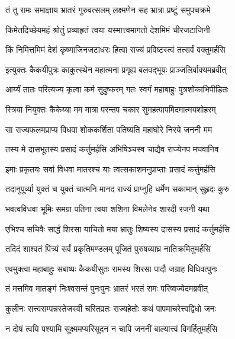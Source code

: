 
\twolineshloka
{तं तु रामः समाज्ञाय भ्रातरं गुरुवत्सलम्}
{लक्ष्मणेन सह भ्रात्रा प्रष्टुं समुपचक्रमे} %

\twolineshloka
{किमेतदिच्छेयमहं श्रोतुं प्रव्याहृतं त्वया}
{यस्मात्त्वमागतो देशमिमं चीरजटाजिनी} %

\twolineshloka
{किं निमित्तमिमं देशं कृष्णाजिनजटाधरः}
{हित्वा राज्यं प्रविष्टस्त्वं तत्सर्वं वक्तुमर्हसि} %

\twolineshloka
{इत्युक्तः कैकयीपुत्रः काकुत्स्थेन महात्मना}
{प्रगृह्य बलवद्भूयः प्राञ्जलिर्वाक्यमब्रवीत्} %

\twolineshloka
{आर्य्यं तातः परित्यज्य कृत्वा कर्म सुदुष्करम्}
{गतः स्वर्गं महाबाहुः पुत्रशोकाभिपीडितः} %

\twolineshloka
{स्त्रिया नियुक्तः कैकेय्या मम मात्रा परन्तप}
{चकार सुमहत्पापमिदमात्मयशोहरम्} %

\twolineshloka
{सा राज्यफलमप्राप्य विधवा शोककर्शिता}
{पतिष्यति महाघोरे निरये जननी मम} %

\twolineshloka
{तस्य मे दासभूतस्य प्रसादं कर्त्तुमर्हसि}
{अभिषिञ्चस्व चाद्यैव राज्येनप मघवानिव} %

\twolineshloka
{इमाः प्रकृतयः सर्वा विधवा मातरश्च याः}
{त्वत्सकाशमनुप्राप्ताः प्रसादं कर्त्तुमर्हसि} %

\twolineshloka
{तदानुपूर्व्या युक्तं च युक्तं चात्मनि मानद}
{राज्यं प्राप्नुहि धर्मेण सकामान् सुहृदः कुरु} %

\twolineshloka
{भवत्वविधवा भूमिः समग्रा पतिना त्वया}
{शशिना विमलेनेव शारदी रजनी यथा} %

\twolineshloka
{एभिश्च सचिवैः सार्द्धं शिरसा याचितो मया}
{भ्रातुः शिष्यस्य दासस्य प्रसादं कर्त्तुमर्हसि} %

\twolineshloka
{तदिदं शाश्वतं पित्र्यं सर्वं प्रकृतिमण्डलम्}
{पूजितं पुरुषव्याघ्र नातिक्रमितुमर्हसि} %

\twolineshloka
{एवमुक्त्वा महाबाहुः सबाष्पः कैकयीसुतः}
{रामस्य शिरसा पादौ जग्राह विधिवत्पुनः} %

\twolineshloka
{तं मत्तमिव मातङ्गं निःश्वसन्तं पुनःपुनः}
{भ्रातरं भरतं रामः परिष्वज्येदमब्रवीत्} %

\twolineshloka
{कुलीनः सत्त्वसम्पन्नस्तेजस्वी चरितव्रतः}
{राज्यहेतोः कथं पापमाचरेत्त्वद्विधो जनः} %

\twolineshloka
{न दोषं त्वयि पश्यामि सूक्ष्ममप्यरिसूदन}
{न चापि जननीं बाल्यात्त्वं विगर्हितुमर्हसि} %

